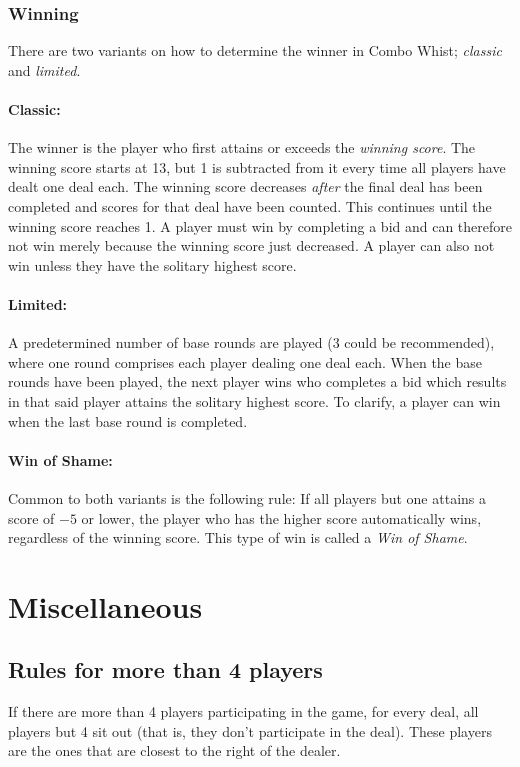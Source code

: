 \documentclass[a4paper]{article}
\begin{document}
			\subsubsection{Winning}
				\label{sec:winning}
				There are two variants on how to determine the winner in Combo Whist; \emph{classic} and \emph{limited}.

				\paragraph{Classic:}
				The winner is the player who first attains or exceeds the \emph{winning score}. The winning score starts at 13, but 1 is subtracted from it every time all players have dealt one deal each. The winning score decreases \emph{after} the final deal has been completed and scores for that deal have been counted. This continues until the winning score reaches 1. A player must win by completing a bid and can therefore not win merely because the winning score just decreased. A player can also not win unless they have the solitary highest score.

				\paragraph{Limited:}
				A predetermined number of base rounds are played (3 could be recommended), where one round comprises each player dealing one deal each. When the base rounds have been played, the next player wins who completes a bid which results in that said player attains the solitary highest score. To clarify, a player can win when the last base round is completed.

				\paragraph{Win of Shame:}
				Common to both variants is the following rule: If all players but one attains a score of $-5$ or lower, the player who has the higher score automatically wins, regardless of the winning score. This type of win is called a \emph{Win of Shame}.

	\section{Miscellaneous}
		\subsection{Rules for more than 4 players}
			If there are more than 4 players participating in the game, for every deal, all players but 4 sit out (that is, they don't participate in the deal). These players are the ones that are closest to the right of the dealer.
		
\end{document}
